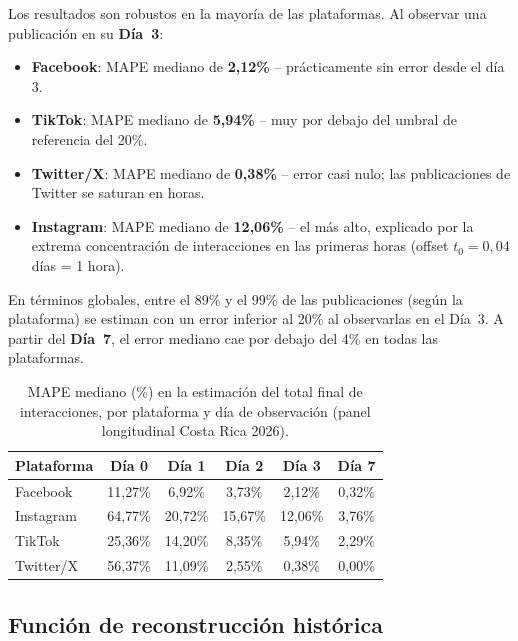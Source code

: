 Los resultados son robustos en la mayoría de las plataformas. Al observar una publicación en su \textbf{Día~3}:

\begin{itemize}
    \item \textbf{Facebook}: MAPE mediano de \textbf{2{,}12\%} -- prácticamente sin error desde el día 3.
    \item \textbf{TikTok}: MAPE mediano de \textbf{5{,}94\%} -- muy por debajo del umbral de referencia del 20\%.
    \item \textbf{Twitter/X}: MAPE mediano de \textbf{0{,}38\%} -- error casi nulo; las publicaciones de Twitter se saturan en horas.
    \item \textbf{Instagram}: MAPE mediano de \textbf{12{,}06\%} -- el más alto, explicado por la extrema concentración de interacciones en las primeras horas (offset $t_0 = 0{,}04$ días = 1 hora).
\end{itemize}

En términos globales, entre el 89\% y el 99\% de las publicaciones (según la plataforma) se estiman con un error inferior al 20\% al observarlas en el Día~3. A partir del \textbf{Día~7}, el error mediano cae por debajo del 4\% en todas las plataformas.

\begin{table}[htbp]
\centering
\caption{MAPE mediano (\%) en la estimación del total final de interacciones, por plataforma y día de observación (panel longitudinal Costa Rica 2026).}
\label{tab:mape_plataforma}
\begin{tabular}{l c c c c c}
\toprule
\textbf{Plataforma} & \textbf{Día 0} & \textbf{Día 1} & \textbf{Día 2} & \textbf{Día 3} & \textbf{Día 7} \\
\midrule
Facebook   & 11{,}27\% &  6{,}92\% & 3{,}73\% & 2{,}12\% & 0{,}32\% \\
Instagram  & 64{,}77\% & 20{,}72\% &15{,}67\% &12{,}06\% & 3{,}76\% \\
TikTok     & 25{,}36\% & 14{,}20\% & 8{,}35\% & 5{,}94\% & 2{,}29\% \\
Twitter/X  & 56{,}37\% & 11{,}09\% & 2{,}55\% & 0{,}38\% & 0{,}00\% \\
\bottomrule
\end{tabular}
\end{table}


\subsection*{Función de reconstrucción histórica}

